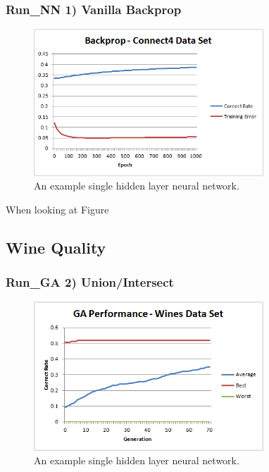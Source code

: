 \documentclass[journal]{IEEEtran}
\begin{document}
    \subsubsection*{Run_{NN} 1) Vanilla Backprop}
      \begin{figure}[here]%
        \centering
        \includegraphics[width=3.4in]{brain_connect4}
        \caption{An example single hidden layer neural network.}
        \label{fig:brain_connect4}
      \end{figure}

    When looking at Figure

  \subsection{Wine Quality}
    \subsubsection*{Run_{GA} 2) Union/Intersect}
      \begin{figure}[here]%
        \centering
        \includegraphics[width=3.4in]{wine_performance_new}
        \caption{An example single hidden layer neural network.}
        \label{fig:wine_performace_new}
      \end{figure}
\end{document}
